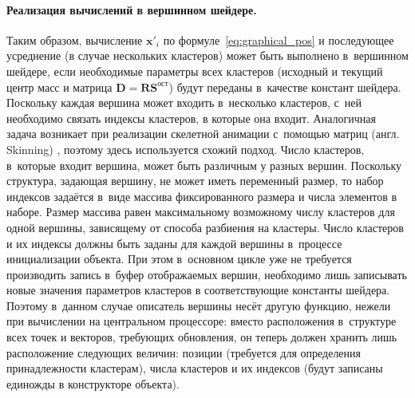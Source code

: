 \documentclass[a4paper, 12pt, titlepage]{extarticle}
\newcommand{\eng}[1]{#1}
\newcommand{\vect}[1]{\mathbf{#1}} %
\newcommand{\matx}[1]{\mathbf{#1}} %
\begin{document}
\begin{original}
        \paragraph{Реализация вычислений в вершинном шейдере.}
        Таким образом, вычисление $\vect{x}'_i$ по формуле~\eqref{eq:graphical_pos} и последующее
        усреднение (в случае нес\-коль\-ких кластеров) может быть выполнено в~вершинном шейдере, если
        необходимые параметры всех кластеров (исходный и текущий центр масс и матрица $\matx D =
        \matx{R} \matx{S}^{ост}$) будут переданы в~качестве констант шейдера. Поскольку каждая
        вершина может входить в~несколько кластеров, с~ней необходимо связать индексы кластеров, в
        которые она входит. Аналогичная задача возникает при реализации скелетной анимации с~помощью
        матриц (англ. \eng{Skinning}) \cite{gpu-gems-skinning}, поэтому здесь используется схожий подход.
        Число кластеров, в~которые входит вершина, может быть различным у разных вершин. Поскольку
        структура, задающая вершину, не может иметь переменный размер, то набор индексов задаётся
        в~виде массива фиксированного размера и числа элементов в наборе. Размер массива равен
        максимальному возможному числу кластеров для одной вершины, зависящему от способа разбиения
        на кластеры. Число кластеров и их индексы должны быть заданы для каждой вершины в~процессе
        инициализации объекта. При этом в~основном цикле уже не требуется
        производить запись в~буфер отображаемых вершин, необходимо лишь записывать новые значения
        параметров кластеров в соответствующие константы шейдера. Поэтому в~данном случае описатель
        вершины несёт другую функцию, нежели при вычислении на центральном процессоре: вместо
        расположения в~структуре всех точек и векторов, требующих обновления, он теперь должен
        хранить лишь расположение следующих величин: позиции (требуется для определения
        принадлежности кластерам), числа кластеров и их индексов (будут записаны единожды в
        конструкторе объекта).
\end{original}
\end{document}
